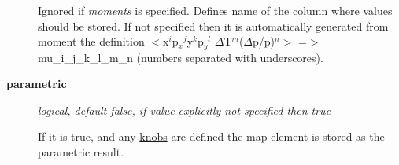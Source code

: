 \begin{description}
 Ignored if \textit{ moments } is specified.        Defines name of the column where values should be stored.        If not specified then it is automatically generated from moment the definition       $<$x$^i$p$_x$$^j$y$^k$p$_y$$^l$       $\Delta$T$^m$($\Delta$p/p)$^n$$>$ =$>$       mu\_i\_j\_k\_l\_m\_n (numbers separated with underscores).                 
	\item[\textbf{ parametric }] \textit{ logical, default false, if value explicitly not specified then true}

 If it is true, and any       \href{PTC_Knob.html}{knobs}        are defined the map element is stored as the parametric result.            
\end{description}

\paragraph{}



% 
% 
% 
% 



